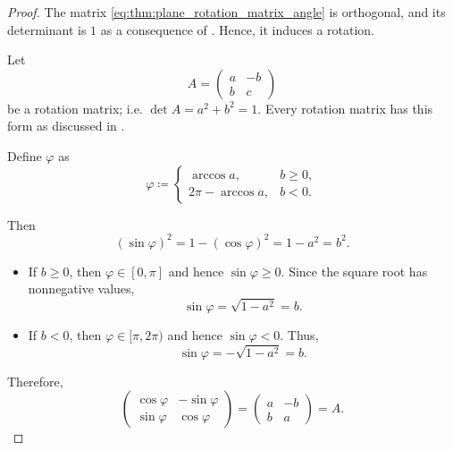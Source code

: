 \begin{proof}
   The matrix \eqref{eq:thm:plane_rotation_matrix_angle} is orthogonal, and its determinant is \( 1 \) as a consequence of . Hence, it induces a rotation.

   Let
  \begin{equation*}
    A
    =
    \begin{pmatrix}
      a & -b \\
      b & c
    \end{pmatrix}
  \end{equation*}
  be a rotation matrix; i.e. \( \det A = a^2 + b^2 = 1 \). Every rotation matrix has this form as discussed in .

  Define \( \varphi \) as
  \begin{equation*}
    \varphi \coloneqq \begin{cases}
      \arccos a,         &b \geq 0, \\
      2 \pi - \arccos a, &b < 0.
    \end{cases}
  \end{equation*}

  Then
  \begin{equation*}
    (\sin \varphi)^2 = 1 - (\cos \varphi)^2 = 1 - a^2 = b^2.
  \end{equation*}

  \begin{itemize}
    \item If \( b \geq 0 \), then \( \varphi \in [0, \pi] \) and hence \( \sin \varphi \geq 0 \). Since the square root has nonnegative values,
    \begin{equation*}
      \sin \varphi = \sqrt{ 1 - a^2 } = b.
    \end{equation*}

    \item If \( b < 0 \), then \( \varphi \in [\pi, 2\pi) \) and hence \( \sin \varphi < 0 \). Thus,
    \begin{equation*}
      \sin \varphi = -\sqrt{ 1 - a^2 } = b.
    \end{equation*}
  \end{itemize}

  Therefore,
  \begin{equation*}
    \begin{pmatrix}
      \cos \varphi & -\sin \varphi \\
      \sin \varphi & \cos \varphi
    \end{pmatrix}
    =
    \begin{pmatrix}
      a & -b \\
      b & a
    \end{pmatrix}
    =
    A.
  \end{equation*}


\end{proof}
